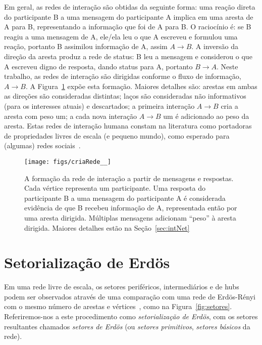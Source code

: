 \documentclass[a4paper,openright,12pt]{report} %
\begin{document}
Em geral, as redes de interação são obtidas da seguinte forma:
uma reação direta do participante B a uma mensagem do participante A implica em uma aresta de A para B,
representando a informação que foi de A para B.
O raciocínio é: se B reagiu
a uma mensagem de A, ele/ela leu o que A escreveu e formulou uma reação, portanto B
assimilou informação de A, assim $A \rightarrow B$.
A inversão da direção da aresta produz a rede de status: B leu a mensagem e considerou
o que A escreveu digno de resposta, dando status para A, portanto $B \rightarrow A$.
Neste trabalho, as redes de interação são dirigidas conforme o fluxo de informação, $A \rightarrow B$.
A Figura~\ref{formationNetwork} expõe esta formação. Maiores detalhes são:
arestas em ambas as direções são consideradas distintas;
laços são consideradas não informativos (para os interesses atuais) e descartados;  
a primeira interação $A\rightarrow B$ cria a aresta com peso um; 
a cada nova interação $A\rightarrow B$ um é adicionado ao peso da aresta.
Estas redes de interação humana constam na literatura como portadoras
de propriedades livres de escala (e pequeno mundo), como esperado
para (algumas) redes sociais~\cite{bird,newmanBook}.

\begin{figure}[!h]
    \centering
    \texttt{[image: figs/criaRede\_\_]}
    \caption{A formação da rede de interação a partir
        de mensagens e respostas.
        Cada vértice representa um participante.
        Uma resposta do participante B a uma
        mensagem do participante A é considerada
        evidência de que B recebeu informação de A,
        representada então por uma aresta dirigida.
        Múltiplas mensagens adicionam ``peso'' à
        aresta dirigida. Maiores detalhes
        estão na Seção~\ref{sec:intNet}}
    \label{formationNetwork}
\end{figure}

\section{Setorialização de Erdös}\label{sec:sec}
Em uma rede livre de escala, os setores periféricos, intermediários
e de hubs podem ser observados através de uma comparação
com uma rede de Erdös-Rényi com o mesmo número de arestas e vértices~\cite{3setores},
como na Figura~\ref{fig:setores}.
Referiremos-nos a este procedimento como \emph{setorialização de Erdös},
com os setores resultantes chamados \emph{setores de Erdös}
(ou \emph{setores primitivos}, \emph{setores básicos} da rede).
\end{document}

